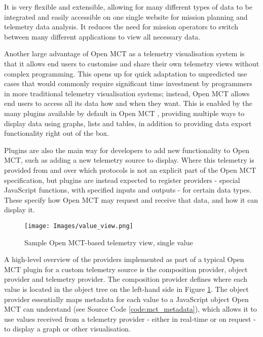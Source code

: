 It is very flexible and extensible, allowing for many different types of data to be integrated and easily accessible on one single website for mission planning and \gls{telemetry} data analysis. It reduces the need for mission operators to switch between many different applications to view all necessary data. \cite{dev_interview, mctos}

Another large advantage of Open MCT as a telemetry visualisation system is that it allows end users to customise and share their own telemetry views without complex programming. This opens up for quick adaptation to unpredicted use cases that would commonly require significant time investment by programmers in more traditional telemetry visualisation systems; instead, Open MCT allows end users to access all its data how and when they want. This is enabled by the many plugins available by default in Open MCT \cite{mctplugins}, providing multiple ways to display data using graphs, lists and tables, in addition to providing data export functionality right out of the box. \cite{omct_intro}

Plugins are also the main way for developers to add new functionality to Open MCT, such as adding a new telemetry source to display. Where this telemetry is provided from and over which protocols is not an explicit part of the Open MCT specification, but plugins are instead expected to register providers - special JavaScript functions, with specified inputs and outputs - for certain data types. These specify how Open MCT may request and receive that data, and how it can display it.

\begin{figure}[H]
    \centering
    \texttt{[image: Images/value\_view.png]}
    \caption{Sample Open MCT-based telemetry view, single value}
    \label{fig:omctvalue}
\end{figure}

A high-level overview of the providers implemented as part of a typical Open MCT plugin for a custom telemetry source is the composition provider, object provider and telemetry provider. The composition provider defines where each value is located in the object tree on the left-hand side in Figure \ref{fig:omctvalue}. The object provider essentially maps metadata for each value to a JavaScript object Open MCT can understand (see Source Code \ref{code:mct_metadata}), which allows it to use values received from a telemetry provider - either in real-time or on request - to display a graph or other visualisation.


